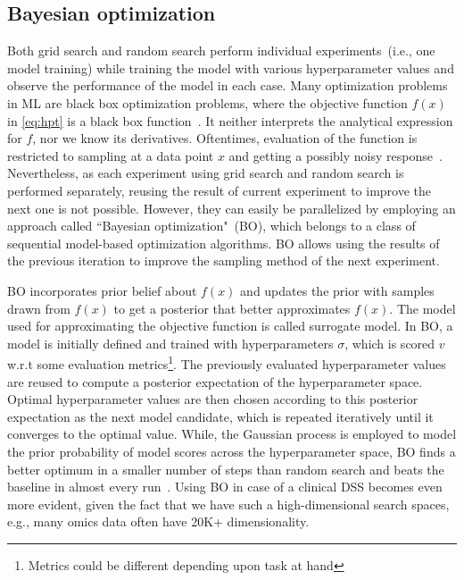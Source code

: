 \subsection{Bayesian optimization} 
Both grid search and random search perform individual experiments~(i.e., one model training) while training the model with various hyperparameter values and observe the performance of the model in each case. Many optimization problems in ML are black box optimization problems, where the objective function $f(x)$ in \cref{eq:hpt} is a black box function~\cite{BO}. It neither interprets the analytical expression for $f$, nor we know its derivatives. Oftentimes, evaluation of the function is restricted to sampling at a data point $x$ and getting a possibly noisy response~\cite{BO}.
Nevertheless, as each experiment using grid search and random search is performed separately, reusing the result of current experiment to improve the next one is not possible. However, they can easily be parallelized by employing an approach called ``Bayesian optimization"~(BO), which belongs to a class of sequential model-based optimization algorithms. BO allows using the results of the previous iteration to improve the sampling method of the next experiment.

\hspace*{3.5mm} BO incorporates prior belief about $f(x)$ and updates the prior with samples drawn from $f(x)$ to get a posterior that better approximates $f(x)$. The model used for approximating the objective function is called surrogate model. In BO, a model is initially defined and trained with hyperparameters $\sigma$, which is scored $v$ w.r.t some evaluation metrics\footnote{Metrics could be different depending upon task at hand}. The previously evaluated hyperparameter values are reused to compute a posterior expectation of the hyperparameter space. Optimal hyperparameter values are then chosen according to this posterior expectation as the next model candidate, which is repeated iteratively until it converges to the optimal value. While, the Gaussian process is employed to model the prior probability of model scores across the hyperparameter space,  
BO finds a better optimum in a smaller number of steps than random search and beats the baseline in almost every run~\cite{BO}. Using BO in case of a clinical DSS becomes even more evident, given the fact that we have such a high-dimensional search spaces, e.g., many omics data often have 20K+ dimensionality. 

